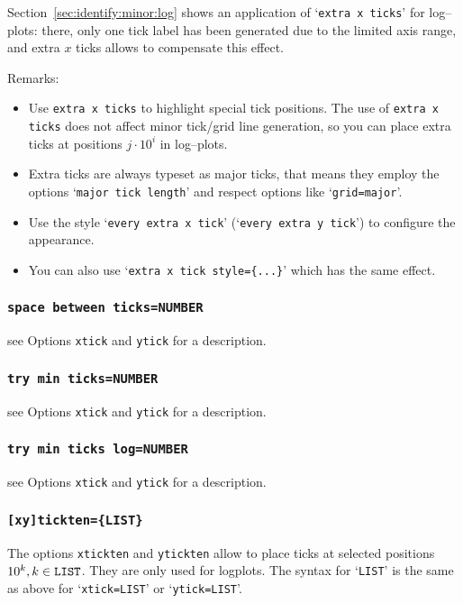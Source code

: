 Section~\ref{sec:identify:minor:log} shows an application of `\texttt{extra x ticks}' for log--plots: there, only one tick label has been generated due to the limited axis range, and extra $x$ ticks allows to compensate this effect. 

Remarks:
\begin{itemize} 
\item Use \texttt{extra x ticks} to highlight special tick positions. The use of \texttt{extra x ticks} does not affect minor tick/grid line generation, so you can place extra ticks at positions $j\cdot 10^i$ in log--plots. 
\item Extra ticks are always typeset as major ticks, that means they employ the options `\texttt{major tick length}' and respect options like `\texttt{grid=major}'.
\item Use the style `\texttt{every extra x tick}' (`\texttt{every extra y tick}') to configure the appearance.
\item You can also use `\texttt{extra x tick style=\{...\}}' which has the same effect.
\end{itemize}

\subsubsection{\texttt{space between ticks=NUMBER}}
see Options \texttt{xtick} and \texttt{ytick} for a description.

\subsubsection{\texttt{try min ticks=NUMBER}}
see Options \texttt{xtick} and \texttt{ytick} for a description.

\subsubsection{\texttt{try min ticks log=NUMBER}}
see Options \texttt{xtick} and \texttt{ytick} for a description.

\subsubsection{\texttt{[xy]tickten=\{LIST\}}}
The options \texttt{xtickten} and \texttt{ytickten} allow to place ticks at selected positions $10^k, k \in \text{\texttt{LIST}}$. They are only used for logplots. The syntax for `\texttt{LIST}' is the same as above for `\texttt{xtick=LIST}' or `\texttt{ytick=LIST}'.

